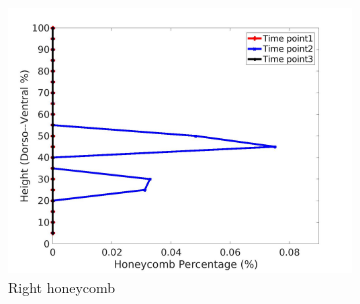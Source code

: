 \begin{figure}[H]
\begin{subfigure}{.42\linewidth}
  \includegraphics[width=\linewidth,trim={{.0\wd0} {.0\wd0} {.0\wd0} {.0\wd0}},clip]{Appendix/Image_AppexA/DorsoToVentral/IPF3RightLungHoneycombDiseaseDorsoToVentral.jpg}
  \caption{Right honeycomb}
  \label{fig:IPF3DiseaseDorsoToVentral-f}
\end{subfigure}
\begin{subfigure}{.42\linewidth}%

\end{subfigure}
\end{figure}

